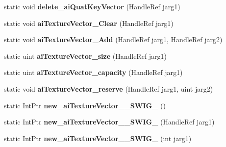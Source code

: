 \begin{DoxyCompactItemize}
\item 
\hypertarget{class_assimp_p_i_n_v_o_k_e_a6551a04bc0d63fff90397d95eb640508}{static void {\bfseries delete\+\_\+ai\+Quat\+Key\+Vector} (Handle\+Ref jarg1)}\label{class_assimp_p_i_n_v_o_k_e_a6551a04bc0d63fff90397d95eb640508}

\item 
\hypertarget{class_assimp_p_i_n_v_o_k_e_ab74232192aa1e4229c1d5b2946a8fb47}{static void {\bfseries ai\+Texture\+Vector\+\_\+\+Clear} (Handle\+Ref jarg1)}\label{class_assimp_p_i_n_v_o_k_e_ab74232192aa1e4229c1d5b2946a8fb47}

\item 
\hypertarget{class_assimp_p_i_n_v_o_k_e_aedefec6fbb35128c4da9de0d90b72d4b}{static void {\bfseries ai\+Texture\+Vector\+\_\+\+Add} (Handle\+Ref jarg1, Handle\+Ref jarg2)}\label{class_assimp_p_i_n_v_o_k_e_aedefec6fbb35128c4da9de0d90b72d4b}

\item 
\hypertarget{class_assimp_p_i_n_v_o_k_e_a9140accea508455b2957305f84438500}{static uint {\bfseries ai\+Texture\+Vector\+\_\+size} (Handle\+Ref jarg1)}\label{class_assimp_p_i_n_v_o_k_e_a9140accea508455b2957305f84438500}

\item 
\hypertarget{class_assimp_p_i_n_v_o_k_e_a6861602ad27f64046112ec75d1f688dd}{static uint {\bfseries ai\+Texture\+Vector\+\_\+capacity} (Handle\+Ref jarg1)}\label{class_assimp_p_i_n_v_o_k_e_a6861602ad27f64046112ec75d1f688dd}

\item 
\hypertarget{class_assimp_p_i_n_v_o_k_e_ac09aa08e35db36fa5baa5e51869b150a}{static void {\bfseries ai\+Texture\+Vector\+\_\+reserve} (Handle\+Ref jarg1, uint jarg2)}\label{class_assimp_p_i_n_v_o_k_e_ac09aa08e35db36fa5baa5e51869b150a}

\item 
\hypertarget{class_assimp_p_i_n_v_o_k_e_a18b6cce5e6c97b1cc2fd596324ae6c82}{static Int\+Ptr {\bfseries new\+\_\+ai\+Texture\+Vector\+\_\+\+\_\+\+S\+W\+I\+G\+\_} ()}\label{class_assimp_p_i_n_v_o_k_e_a18b6cce5e6c97b1cc2fd596324ae6c82}

\item 
\hypertarget{class_assimp_p_i_n_v_o_k_e_af2fbed6010f09c03d04b9e1618e4a279}{static Int\+Ptr {\bfseries new\+\_\+ai\+Texture\+Vector\+\_\+\+\_\+\+S\+W\+I\+G\+\_} (Handle\+Ref jarg1)}\label{class_assimp_p_i_n_v_o_k_e_af2fbed6010f09c03d04b9e1618e4a279}

\item 
\hypertarget{class_assimp_p_i_n_v_o_k_e_a88e6e11421fff1966116178562b05284}{static Int\+Ptr {\bfseries new\+\_\+ai\+Texture\+Vector\+\_\+\+\_\+\+S\+W\+I\+G\+\_} (int jarg1)}\label{class_assimp_p_i_n_v_o_k_e_a88e6e11421fff1966116178562b05284}


\end{DoxyCompactItemize}
